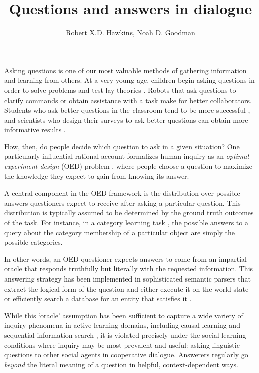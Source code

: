 \documentclass[11pt, floatsintext]{apa6}
\title{Questions and answers in dialogue} %
\author{Robert X.D. Hawkins, Noah D. Goodman}
\affiliation{Stanford University}
\begin{document}
\maketitle
Asking questions is one of our most valuable methods of gathering information and learning from others. 
At a very young age, children begin asking questions in order to solve problems and test lay theories \cite{LegareEtAl13_QuestionsChildhood, Chouinard07_ChildrenQuestions,CallananOakes92_PreschoolerQuestions}. 
Robots that ask questions to clarify commands \cite{DeitsTellex___Roy13_HumanRobotDialog} or obtain assistance with a task \cite{FongThorpeBaur03_RobotQuestions} make for better collaborators. 
Students who ask better questions in the classroom tend to be more successful \cite{GraesserPerson94_QuestionAskingTutoring}, and scientists who design their surveys to ask better questions can obtain more informative results \cite{ClarkSchober92_InfluencingAnswers}.

How, then, do people decide which question to ask in a given situation?
One particularly influential rational account formalizes human inquiry as an \emph{optimal experiment design} (OED) problem \cite{OaksfordChater94_RationalAnalysisSelectionTask,Nelson05_UsefulQuestions,MyungPitt09_OED, GureckisMarkant12_SelfDirectedLearning,coenen2018asking}, where people choose a question to maximize the knowledge they expect to gain from knowing its answer. 

A central component in the OED framework is the distribution over possible answers questioners expect to receive after asking a particular question.
This distribution is typically assumed to be determined by the ground truth outcomes of the task. 
For instance, in a category learning task \cite{MarkantGureckis14_ActiveLearning}, the possible answers to a query about the category membership of a particular object are simply the possible categories.

In other words, an OED questioner expects answers to come from an impartial oracle that responds truthfully but literally with the requested information.
This answering strategy has been implemented in sophisticated semantic parsers that extract the logical form of the question and either execute it on the world state \cite{rothe2017question} or efficiently search a database for an entity that satisfies it \cite{BerantChouFrostigLiang13_FreebaseQAPairs}. 

While this `oracle' assumption has been sufficient to capture a wide variety of inquiry phenomena in active learning domains, including causal learning \cite{bramley2015conservative} and sequential information search \cite{RuggeriLombrozo15_ChildrenAdaptQuestions}, it is violated precisely under the social learning conditions where inquiry may be most prevalent and useful: asking linguistic questions to other social agents in cooperative dialogue.
Answerers regularly go \emph{beyond} the literal meaning of a question in helpful, context-dependent ways.
\end{document}
